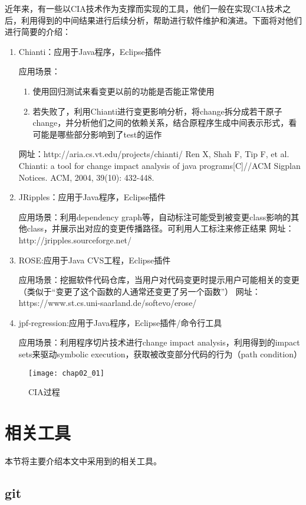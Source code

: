 近年来，有一些以CIA技术作为支撑而实现的工具，他们一般在实现CIA技术之后，利用得到的中间结果进行后续分析，帮助进行软件维护和演进。下面将对他们进行简要的介绍：
\begin{enumerate}
	\item Chianti：应用于Java程序，Eclipse插件

	应用场景：
	\begin{enumerate}
	
		\item 使用回归测试来看变更以前的功能是否能正常使用
		\item 若失败了，利用Chianti进行变更影响分析，将change拆分成若干原子change，并分析他们之间的依赖关系，结合原程序生成中间表示形式，看可能是哪些部分影响到了test的运作
	\end{enumerate}
	网址：http://aria.cs.vt.edu/projects/chianti/
	Ren X, Shah F, Tip F, et al. Chianti: a tool for change impact analysis of java programs[C]//ACM Sigplan Notices. ACM, 2004, 39(10): 432-448.
	
	\item JRipples：应用于Java程序，Eclipse插件
	
	应用场景：利用dependency graph等，自动标注可能受到被变更class影响的其他class，并展示出对应的变更传播路径。可利用人工标注来修正结果
	网址：http://jripples.sourceforge.net/
	
	\item ROSE:应用于Java CVS工程，Eclipse插件

	应用场景：挖掘软件代码仓库，当用户对代码变更时提示用户可能相关的变更（类似于“变更了这个函数的人通常还变更了另一个函数”）
	网址：https://www.st.cs.uni-saarland.de/softevo/erose/
	
	\item jpf-regression:应用于Java程序，Eclipse插件/命令行工具

	应用场景：利用程序切片技术进行change impact analysis，利用得到的impact sets来驱动symbolic execution，获取被改变部分代码的行为（path condition）
\end{enumerate}

\begin{figure}[H]
	\centering
	\texttt{[image: chap02\_01]}
	\caption {CIA过程}
\end{figure}

\section{相关工具}
	本节将主要介绍本文中采用到的相关工具。
	

	\subsection{git}		


